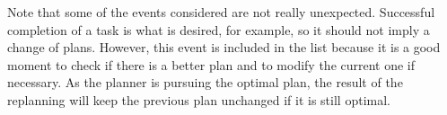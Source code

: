 Note that some of the events considered are not really unexpected. Successful completion of a task is what is desired, for example, so it should not imply a change of plans. However, this event is included in the list because it is a good moment to check if there is a better plan and to modify the current one if necessary. As the planner is pursuing the optimal plan, the result of the replanning will keep the previous plan unchanged if it is still optimal.